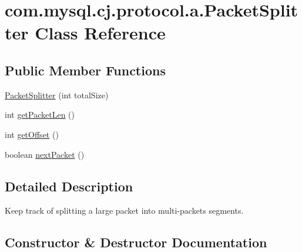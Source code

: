 \hypertarget{classcom_1_1mysql_1_1cj_1_1protocol_1_1a_1_1_packet_splitter}{}\section{com.\+mysql.\+cj.\+protocol.\+a.\+Packet\+Splitter Class Reference}
\label{classcom_1_1mysql_1_1cj_1_1protocol_1_1a_1_1_packet_splitter}
\subsection*{Public Member Functions}
\begin{DoxyCompactItemize}
\item 
\mbox{\hyperlink{classcom_1_1mysql_1_1cj_1_1protocol_1_1a_1_1_packet_splitter_a8ca8ac21ce49ca14892f6df1c407e316}{Packet\+Splitter}} (int total\+Size)
\item 
int \mbox{\hyperlink{classcom_1_1mysql_1_1cj_1_1protocol_1_1a_1_1_packet_splitter_a0d8595300e2493752ea6acc57e4862f1}{get\+Packet\+Len}} ()
\item 
int \mbox{\hyperlink{classcom_1_1mysql_1_1cj_1_1protocol_1_1a_1_1_packet_splitter_a7793518d23e90460aa52781feff949f8}{get\+Offset}} ()
\item 
boolean \mbox{\hyperlink{classcom_1_1mysql_1_1cj_1_1protocol_1_1a_1_1_packet_splitter_a459dc7fa27caddbb835946d20e8c9bf9}{next\+Packet}} ()
\end{DoxyCompactItemize}


\subsection{Detailed Description}
Keep track of splitting a large packet into multi-\/packets segments. 

\subsection{Constructor \& Destructor Documentation}
\mbox{\label{classcom_1_1mysql_1_1cj_1_1protocol_1_1a_1_1_packet_splitter_a8ca8ac21ce49ca14892f6df1c407e316}} 
